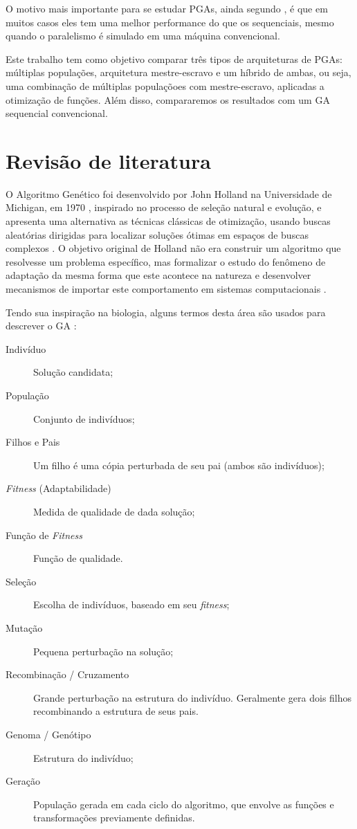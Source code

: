 \documentclass[12pt]{article}
\begin{document}
O motivo mais importante para se estudar PGAs, ainda segundo \cite{paraleltax}, é que em muitos casos eles tem uma melhor performance do que os sequenciais, mesmo quando o paralelismo é simulado em uma máquina convencional. 

Este trabalho tem como objetivo comparar três tipos de arquiteturas de PGAs: múltiplas populações, arquitetura mestre-escravo e um híbrido de ambas, ou seja, uma combinação de múltiplas populaçõoes com mestre-escravo, aplicadas a otimização de funções. Além disso, compararemos os resultados com um GA sequencial convencional.

\section{Revisão de literatura} %
\label{sec:revisao_bibliogragica}


O Algoritmo Genético foi desenvolvido por John Holland na Universidade de Michigan, em 1970 \cite{holland1975}, inspirado no processo de seleção natural e evolução, e apresenta uma alternativa as técnicas clássicas de otimização, usando buscas aleatórias dirigidas para localizar soluções ótimas em espaços de buscas complexos \cite{gasurvey}. O objetivo original de Holland não era construir um algoritmo que resolvesse um problema específico, mas formalizar o estudo do fenômeno de adaptação da mesma forma que este acontece na natureza e desenvolver mecanismos de importar este comportamento em sistemas computacionais \cite{geintro1998}.

Tendo sua inspiração na biologia, alguns termos desta área são usados para descrever o GA \cite{luke2009}:
\begin{description}
	\item [Indivíduo] Solução candidata;
	\item [População] Conjunto de indivíduos;
	\item [Filhos e Pais] Um filho é uma cópia perturbada de seu pai (ambos são indivíduos);
	\item [\emph{Fitness} (Adaptabilidade)] Medida de qualidade de dada solução; 
	\item [Função de \emph{Fitness}] Função de qualidade. 
  \item [Seleção] Escolha de indivíduos, baseado em seu \emph{fitness};
  \item [Mutação] Pequena perturbação na solução;
  \item [Recombinação / Cruzamento] Grande perturbação na estrutura do indivíduo. Geralmente gera dois filhos recombinando a estrutura de seus pais.
  \item [Genoma / Genótipo] Estrutura do indivíduo;
  \item [Geração] População gerada em cada ciclo do algoritmo, que envolve as funções e transformações previamente definidas.
 \end{description}
\end{document}
